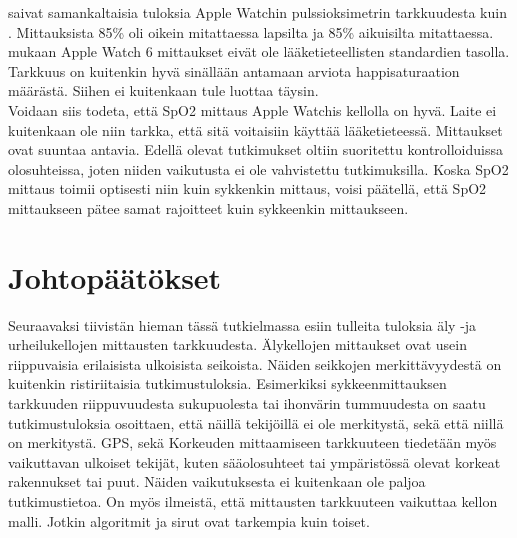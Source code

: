 \documentclass[utf8,bachelor,finnish]{bachelor}
\begin{document}
  \textcite{patz_accuracy_2023} saivat samankaltaisia tuloksia Apple Watchin pulssioksimetrin tarkkuudesta kuin \textcite{pipek_comparison_2021}. Mittauksista 85\%
   oli oikein mitattaessa lapsilta ja 85\% aikuisilta mitattaessa. \textcite{patz_accuracy_2023} mukaan Apple Watch 6 mittaukset eivät ole
    lääketieteellisten standardien tasolla. Tarkkuus on kuitenkin hyvä sinällään antamaan arviota happisaturaation määrästä.
     Siihen ei kuitenkaan tule luottaa täysin.\\

    Voidaan siis todeta, että SpO2 mittaus Apple Watchis kellolla on hyvä. Laite ei kuitenkaan ole niin tarkka, että sitä voitaisiin käyttää
     lääketieteessä. Mittaukset ovat suuntaa antavia. Edellä olevat tutkimukset oltiin suoritettu kontrolloiduissa olosuhteissa, joten niiden vaikutusta ei ole vahvistettu tutkimuksilla.
      Koska SpO2 mittaus toimii optisesti niin kuin sykkenkin mittaus, voisi päätellä, että SpO2 mittaukseen pätee samat rajoitteet kuin sykkeenkin mittaukseen. \\

      
    
  
  
\chapter{Johtopäätökset}

Seuraavaksi tiivistän hieman tässä tutkielmassa esiin tulleita tuloksia äly -ja urheilukellojen mittausten tarkkuudesta.
 Älykellojen mittaukset ovat usein riippuvaisia erilaisista ulkoisista seikoista. Näiden seikkojen merkittävyydestä on kuitenkin ristiriitaisia tutkimustuloksia.
  Esimerkiksi sykkeenmittauksen tarkkuuden riippuvuudesta sukupuolesta tai ihonvärin tummuudesta on saatu tutkimustuloksia
   osoittaen, että näillä tekijöillä ei ole merkitystä, sekä että niillä on merkitystä. GPS, sekä Korkeuden mittaamiseen tarkkuuteen tiedetään myös vaikuttavan
    ulkoiset tekijät, kuten sääolosuhteet tai ympäristössä olevat korkeat rakennukset tai puut. Näiden vaikutuksesta ei kuitenkaan ole paljoa tutkimustietoa.
     On myös ilmeistä, että mittausten tarkkuuteen vaikuttaa kellon malli. Jotkin algoritmit ja sirut ovat tarkempia kuin toiset.\\
\end{document}
